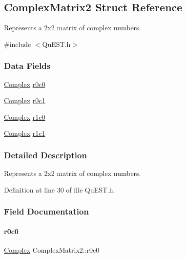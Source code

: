 \hypertarget{structComplexMatrix2}{}\subsection{Complex\+Matrix2 Struct Reference}
\label{structComplexMatrix2}


Represents a 2x2 matrix of complex numbers.  




{\ttfamily \#include $<$Qu\+E\+S\+T.\+h$>$}

\subsubsection*{Data Fields}
\begin{DoxyCompactItemize}
\item 
\mbox{\hyperlink{structComplex}{Complex}} \mbox{\hyperlink{structComplexMatrix2_ae72b4458233b077a636beee1892e81ff}{r0c0}}
\item 
\mbox{\hyperlink{structComplex}{Complex}} \mbox{\hyperlink{structComplexMatrix2_a0f3932f055a8b05cef361bce25d51172}{r0c1}}
\item 
\mbox{\hyperlink{structComplex}{Complex}} \mbox{\hyperlink{structComplexMatrix2_ab98282015ed2065e53fbc9638e2583ab}{r1c0}}
\item 
\mbox{\hyperlink{structComplex}{Complex}} \mbox{\hyperlink{structComplexMatrix2_a763007c3070802373549ba0350f83c8a}{r1c1}}
\end{DoxyCompactItemize}


\subsubsection{Detailed Description}
Represents a 2x2 matrix of complex numbers. 

Definition at line 30 of file Qu\+E\+S\+T.\+h.



\subsubsection{Field Documentation}
\mbox{\label{structComplexMatrix2_ae72b4458233b077a636beee1892e81ff}} 
\paragraph{\texorpdfstring{r0c0}{r0c0}}
{\footnotesize\ttfamily \mbox{\hyperlink{structComplex}{Complex}} Complex\+Matrix2\+::r0c0}



